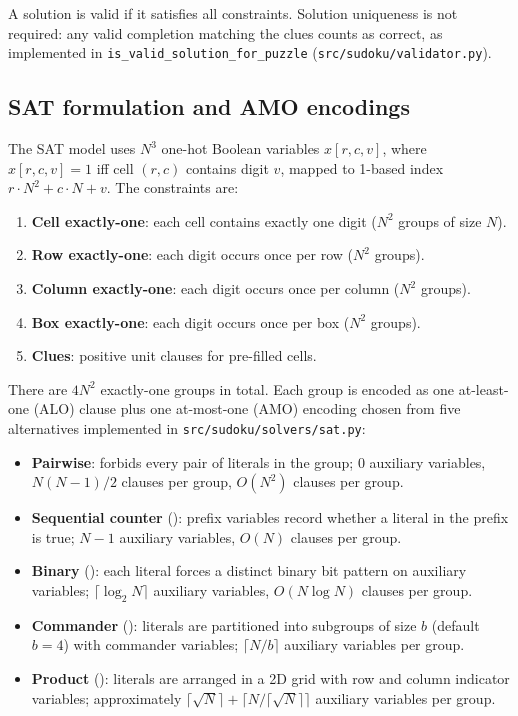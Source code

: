 \documentclass[a4paper,fleqn]{cas-sc}
\newcommand{\code}[1]{\texttt{\nolinkurl{#1}}}
\begin{document}
A solution is valid if it satisfies all constraints. Solution uniqueness is not required: any valid completion matching the clues counts as correct, as implemented in \code{is_valid_solution_for_puzzle} (\code{src/sudoku/validator.py}).

\subsection{SAT formulation and AMO encodings}

The SAT model uses \(N^3\) one-hot Boolean variables \(x[r,c,v]\), where \(x[r,c,v]=1\) iff cell \((r,c)\) contains digit \(v\), mapped to 1-based index \(r\cdot N^2 + c\cdot N + v\). The constraints are:
\begin{enumerate}
    \item \textbf{Cell exactly-one}: each cell contains exactly one digit (\(N^2\) groups of size \(N\)).
    \item \textbf{Row exactly-one}: each digit occurs once per row (\(N^2\) groups).
    \item \textbf{Column exactly-one}: each digit occurs once per column (\(N^2\) groups).
    \item \textbf{Box exactly-one}: each digit occurs once per box (\(N^2\) groups).
    \item \textbf{Clues}: positive unit clauses for pre-filled cells.
\end{enumerate}

There are \(4N^2\) exactly-one groups in total. Each group is encoded as one at-least-one (ALO) clause plus one at-most-one (AMO) encoding chosen from five alternatives implemented in \code{src/sudoku/solvers/sat.py}:

\begin{itemize}
    \item \textbf{Pairwise}: forbids every pair of literals in the group; \(0\) auxiliary variables, \(N(N-1)/2\) clauses per group, \(O(N^2)\) clauses per group.
    \item \textbf{Sequential counter} (\citeyear{sinz2005towards}): prefix variables record whether a literal in the prefix is true; \(N-1\) auxiliary variables, \(O(N)\) clauses per group.
    \item \textbf{Binary} (\citeyear{frisch2010sat}): each literal forces a distinct binary bit pattern on auxiliary variables; \(\lceil\log_2 N\rceil\) auxiliary variables, \(O(N\log N)\) clauses per group.
    \item \textbf{Commander} (\citeyear{klieber2007effective}): literals are partitioned into subgroups of size \(b\) (default \(b=4\)) with commander variables; \(\lceil N/b\rceil\) auxiliary variables per group.
    \item \textbf{Product} (\citeyear{chen2010new}): literals are arranged in a 2D grid with row and column indicator variables; approximately \(\lceil\sqrt{N}\rceil +\allowbreak \lceil N/\lceil\sqrt{N}\rceil\rceil\) auxiliary variables per group.
\end{itemize}
\end{document}
